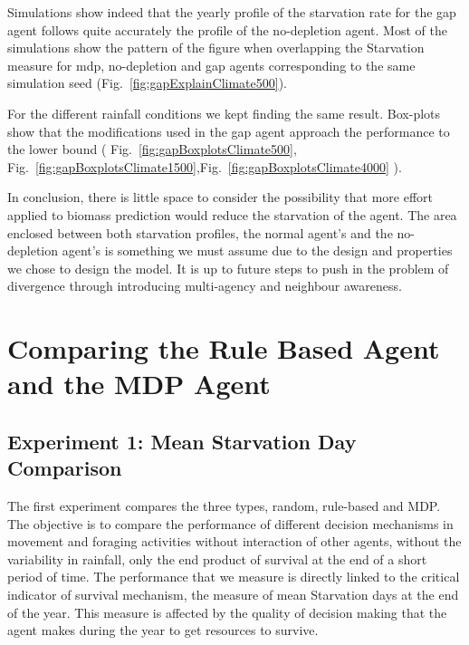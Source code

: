 \documentclass[11pt,oneside,a4paper,openright]{report}
\begin{document}
Simulations show indeed that the yearly profile of the starvation rate for the gap agent follows quite 
accurately the profile of the no-depletion agent. Most of the simulations show the pattern of the figure 
when overlapping the Starvation measure for mdp, no-depletion and gap agents corresponding to the same 
simulation seed (Fig.~\ref{fig:gapExplainClimate500}).  

For the different rainfall conditions we kept finding the same result. Box-plots show that the modifications
used in the gap agent approach the performance to the lower bound ( Fig.~\ref{fig:gapBoxplotsClimate500},
Fig.~\ref{fig:gapBoxplotsClimate1500},Fig.~\ref{fig:gapBoxplotsClimate4000} ). 

In conclusion, there is little space to consider the possibility that more effort applied to biomass 
prediction would reduce the starvation of the agent. The area enclosed between both starvation profiles, the 
normal agent's and the no-depletion agent's is something we must assume due to the design and properties we 
chose to design the model. It is up to future steps to push in the problem of divergence through introducing 
multi-agency and neighbour awareness.


\newpage
\section{Comparing the Rule Based Agent and the MDP Agent}


\subsection{Experiment 1: Mean Starvation Day Comparison}
\label{sec:expEcsi1}
The first experiment compares the three types, random, rule-based and MDP. The objective is to compare
the performance of different decision mechanisms in movement and foraging activities without interaction
of other agents, without the variability in rainfall, only the end product of survival at the end of a 
short period of time. 
The performance that we measure is directly linked to the critical indicator of survival mechanism, the
measure of mean Starvation days at the end of the year. This measure is affected by the quality of decision
making that the agent makes during the year to get resources to survive.
\end{document}
